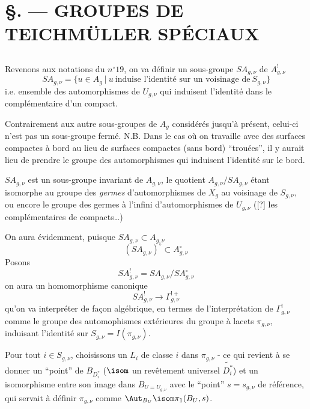 \chapter*{\S {}. --- GROUPES DE TEICHMÜLLER SPÉCIAUX}\thispagestyle{empty}
\label{sec:25}
\section*{}

Revenons aux notations du $n^\circ 19$, on va définir un sous-groupe $S A_{g, \nu}$ de $A^!_{g, \nu}$
$$
S A_{g, \nu} = \{ u \in A_g~|~u~\text{induise l'identité sur un voisinage de}~S_{g, \nu} \}
$$
i.e. ensemble des automorphismes de $U_{g, \nu}$ qui induisent l'identité dans le complémentaire d'un compact.

Contrairement aux autre sous-groupes de $A_g$ considérés jusqu'à présent, celui-ci n'est pas un sous-groupe fermé. N.B. Dans le cas où on travaille avec des surfaces compactes à bord au lieu de surfaces compactes (sans bord) ``trouées'', il y aurait lieu de prendre le groupe des automorphismes qui induisent l'identité sur le bord. 

$S A_{g, \nu}$ est un sous-groupe invariant de $A_{g, \nu}$, le quotient $A_{g, \nu}/SA_{g, \nu}$ étant isomorphe au groupe des \emph{germes} d'automorphismes de $X_g$ au voisinage de $S_{g, \nu}$, ou encore le groupe des germes à l'infini d'automorphismes de $U_{g, \nu}$ ([?] les complémentaires de compacts\dots)

On aura évidemment, puisque $SA_{g, \nu} \subset  A_{g, \nu}$
$$
(SA_{g, \nu})^\circ \subset  A^\circ_{g, \nu}
$$
Posons
$$
S A^!_{g, \nu} = SA_{g, \nu}/SA^\circ_{g, \nu}
$$
on aura un homomorphisme canonique
$$
SA^!_{g, \nu} \to \Gamma_{g, \nu}^{!+}
$$
qu'on va interpréter de fa\c{c}on algébrique, en termes de l'interprétation de $\Gamma^!_{g, \nu}$ comme le groupe des automophismes extérieures du groupe à lacets $\pi_{g, \nu}$, induisant l'identité sur $S_{g, \nu} = I(\pi_{g, \nu})$.

Pour tout $i \in S_{g, \nu}$, choisissons un $L_i$ de classe $i$ dans $\pi_{g, \nu}$ - ce qui revient à se donner un ``point'' de $B_{D^*_i}$ ($\isom$ un revêtement universel $\widetilde{D^*_i}$) et un isomorphisme entre son image dans $B_{U = U_{g, \nu}}$ avec le ``point'' $s = s_{g, \nu}$ de référence, qui servait à définir $\pi_{g, \nu}$ comme $\Aut_{B_U} \isom \pi_1(B_U, s)$.

